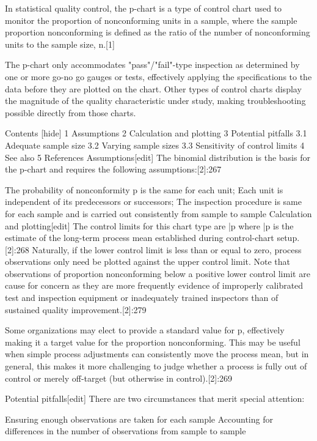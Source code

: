 In statistical quality control, the p-chart is a type of control chart used to monitor the proportion of nonconforming units in a sample, where the sample proportion nonconforming is defined as the ratio of the number of nonconforming units to the sample size, n.[1]

The p-chart only accommodates "pass"/"fail"-type inspection as determined by one or more go-no go gauges or tests, effectively applying the specifications to the data before they are plotted on the chart. Other types of control charts display the magnitude of the quality characteristic under study, making troubleshooting possible directly from those charts.

Contents  [hide] 
1	Assumptions
2	Calculation and plotting
3	Potential pitfalls
3.1	Adequate sample size
3.2	Varying sample sizes
3.3	Sensitivity of control limits
4	See also
5	References
Assumptions[edit]
The binomial distribution is the basis for the p-chart and requires the following assumptions:[2]:267

The probability of nonconformity p is the same for each unit;
Each unit is independent of its predecessors or successors;
The inspection procedure is same for each sample and is carried out consistently from sample to sample
Calculation and plotting[edit]
The control limits for this chart type are \bar p  where \bar p is the estimate of the long-term process mean established during control-chart setup.[2]:268 Naturally, if the lower control limit is less than or equal to zero, process observations only need be plotted against the upper control limit. Note that observations of proportion nonconforming below a positive lower control limit are cause for concern as they are more frequently evidence of improperly calibrated test and inspection equipment or inadequately trained inspectors than of sustained quality improvement.[2]:279

Some organizations may elect to provide a standard value for p, effectively making it a target value for the proportion nonconforming. This may be useful when simple process adjustments can consistently move the process mean, but in general, this makes it more challenging to judge whether a process is fully out of control or merely off-target (but otherwise in control).[2]:269

Potential pitfalls[edit]
There are two circumstances that merit special attention:

Ensuring enough observations are taken for each sample
Accounting for differences in the number of observations from sample to sample
